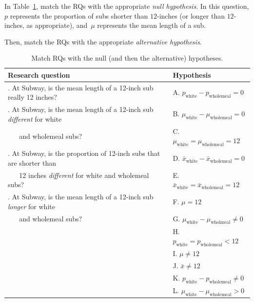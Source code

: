 \documentclass[
  11pt,
  a4paper,
  krantz2]{krantz}
\begin{document}
In Table~\ref{tab:SubwayHyp}, match the RQs with the appropriate \emph{null hypothesis}.
In this question, \(p\) represents the proportion of subs shorter than \(12\)-inches (or longer than \(12\)-inches, as appropriate), and~\(\mu\) represents the mean length of a sub.

Then, match the RQs with the appropriate \emph{alternative hypothesis}.

\begin{table}
\centering
\caption{\label{tab:SubwayHyp}Match RQs with the null (and then the alternative) hypotheses.}
\centering
\fontsize{10}{12}\selectfont
\begin{tabular}[t]{>{\raggedright\arraybackslash}p{}>{\raggedright\arraybackslash}p{}}
\toprule
\textbf{Research question} & \textbf{Hypothesis}\\
\midrule
1. At Subway, is the mean length of a 12-inch sub really 12 inches? & A. $p_\textrm{white} - p_\textrm{wholemeal} = 0$\\
\addlinespace
2. At Subway, is the mean length of a 12-inch sub \emph{different} for white & B. $\mu_\textrm{white} - \mu_\textrm{wholemeal} = 0$\\
\addlinespace
~ ~  and wholemeal subs? & C. $\mu_\textrm{white} = \mu_\textrm{wholemeal} = 12$\\
\addlinespace
3. At Subway, is the proportion of 12-inch subs that are shorter than & D. $\bar{x}_\textrm{white} - \bar{x}_\textrm{wholemeal} = 0$\\
\addlinespace
~ ~ 12 inches \emph{different} for white and wholemeal subs? & E. $\bar{x}_\textrm{white} = \bar{x}_\textrm{wholemeal} = 12$\\
\addlinespace
4. At Subway, is the mean length of a 12-inch sub \emph{longer} for white & F. $\mu = 12$\\
\addlinespace
~ ~ and wholemeal subs? & G. $\mu_\textrm{white} - \mu_\textrm{wholmeal} \ne 0$\\
\addlinespace
 & H. $p_\textrm{white} = p_\textrm{wholemeal} < 12$\\
\addlinespace
 & I. $\mu \ne 12$\\
\addlinespace
 & J. $\bar{x} \ne 12$\\
\addlinespace
 & K. $p_\textrm{white} - p_\textrm{wholemeal} \ne 0$\\
\addlinespace
 & L. $\mu_{\text{white}} - \mu_{\text{wholemeal}} > 0$\\
\bottomrule
\end{tabular}
\end{table}
\end{document}
